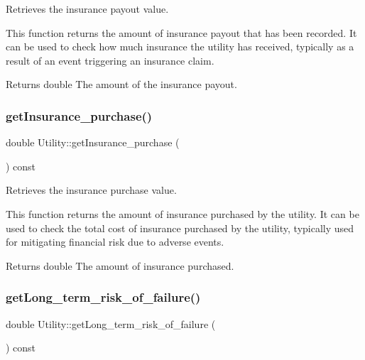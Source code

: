 Retrieves the insurance payout value. 

This function returns the amount of insurance payout that has been recorded. It can be used to check how much insurance the utility has received, typically as a result of an event triggering an insurance claim.

\begin{DoxyReturn}{Returns}
double The amount of the insurance payout. 
\end{DoxyReturn}
\mbox{\label{classUtility_aa9a26e9b3b5af555c8278330c9f4a468}} 
\subsubsection{\texorpdfstring{get\+Insurance\+\_\+purchase()}{getInsurance\_purchase()}}
{\footnotesize\ttfamily double Utility\+::get\+Insurance\+\_\+purchase (\begin{DoxyParamCaption}{ }\end{DoxyParamCaption}) const}



Retrieves the insurance purchase value. 

This function returns the amount of insurance purchased by the utility. It can be used to check the total cost of insurance purchased by the utility, typically used for mitigating financial risk due to adverse events.

\begin{DoxyReturn}{Returns}
double The amount of insurance purchased. 
\end{DoxyReturn}
\mbox{\label{classUtility_a6ac587bf46d7147f9722dc4c89abbb3b}} 
\subsubsection{\texorpdfstring{get\+Long\+\_\+term\+\_\+risk\+\_\+of\+\_\+failure()}{getLong\_term\_risk\_of\_failure()}}
{\footnotesize\ttfamily double Utility\+::get\+Long\+\_\+term\+\_\+risk\+\_\+of\+\_\+failure (\begin{DoxyParamCaption}{ }\end{DoxyParamCaption}) const}




